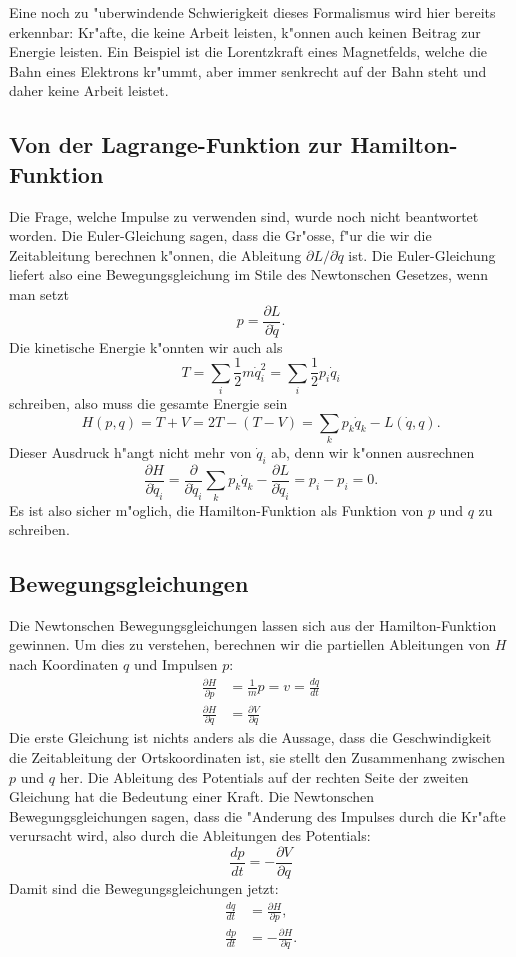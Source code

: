 Eine noch zu "uberwindende Schwierigkeit dieses Formalismus wird hier
bereits erkennbar: Kr"afte, die keine Arbeit leisten, k"onnen auch
keinen Beitrag zur Energie leisten.
Ein Beispiel ist
die Lorentzkraft eines Magnetfelds, welche die Bahn eines Elektrons 
kr"ummt, aber immer senkrecht auf der Bahn steht und daher keine Arbeit
leistet.

\subsection{Von der Lagrange-Funktion zur Hamilton-Funktion}
Die Frage, welche Impulse zu verwenden sind, wurde noch nicht beantwortet
worden.
Die Euler-Gleichung sagen, dass die Gr"osse, f"ur die wir die Zeitableitung
berechnen k"onnen, die Ableitung $\partial L/\partial\dot q$ ist.
Die Euler-Gleichung liefert also eine Bewegungsgleichung im Stile des
Newtonschen Gesetzes, wenn man setzt
\[
p=\frac{\partial L}{\partial \dot q}.
\]
Die kinetische Energie k"onnten wir auch als
\[
T=\sum_i \frac12m\dot q_i^2=\sum_i \frac12 p_i\dot q_i
\]
schreiben, also muss die gesamte Energie sein
\begin{equation}
H(p,q)=T+V = 2T - (T - V)
=
\sum_k p_k\dot q_k - L(\dot q, q).
\label{skript:von-lagrange-zu-hamilton}
\end{equation}
Dieser Ausdruck h"angt nicht mehr von $\dot q_i$ ab, denn wir
k"onnen ausrechnen
\[
\frac{\partial H}{\partial\dot q_i}
=
\frac{\partial}{\partial \dot q_i}\sum_k p_k\dot q_k
-
\frac{\partial L}{\partial \dot q_i}
=
p_i-p_i=0.
\]
Es ist also sicher m"oglich, die Hamilton-Funktion als Funktion von $p$
und $q$ zu schreiben.

\subsection{Bewegungsgleichungen}
Die Newtonschen Bewegungsgleichungen lassen sich aus der Hamilton-Funktion
gewinnen. Um dies zu verstehen, berechnen wir die partiellen Ableitungen
von $H$ nach Koordinaten $q$ und Impulsen $p$:
\begin{align*}
\frac{\partial H}{\partial p}&=\frac{1}{m}p=v=\frac{dq}{dt} \\
\frac{\partial H}{\partial q}&=\frac{\partial V}{\partial q}
\end{align*}
Die erste Gleichung ist nichts anders als die Aussage, dass die
Geschwindigkeit die Zeitableitung der Ortskoordinaten ist, sie
stellt den Zusammenhang zwischen $p$ und $q$ her.
Die Ableitung des Potentials auf der rechten Seite der zweiten
Gleichung hat die Bedeutung einer Kraft.
Die Newtonschen Bewegungsgleichungen sagen, dass die "Anderung des
Impulses durch die Kr"afte verursacht wird, also durch die Ableitungen
des Potentials:
\[
\frac{dp}{dt}=-\frac{\partial V}{\partial q}
\]
Damit sind die Bewegungsgleichungen jetzt:
\begin{align}
\frac{dq}{dt}&= \frac{\partial H}{\partial p},\label{skript:hamilton-v}\\
\frac{dp}{dt}&=-\frac{\partial H}{\partial q}.\label{skript:hamilton-newton}
\end{align}

